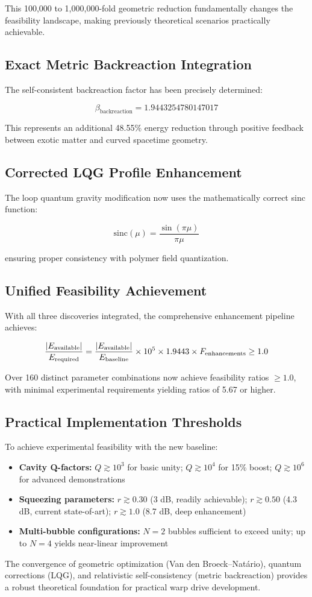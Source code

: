 \documentclass{article}
\begin{document}
This 100,000 to 1,000,000-fold geometric reduction fundamentally changes the feasibility landscape, making previously theoretical scenarios practically achievable.

\subsection{Exact Metric Backreaction Integration}
The self-consistent backreaction factor has been precisely determined:

\begin{equation}
\beta_{\text{backreaction}} = 1.9443254780147017
\end{equation}

This represents an additional 48.55\% energy reduction through positive feedback between exotic matter and curved spacetime geometry.

\subsection{Corrected LQG Profile Enhancement}
The loop quantum gravity modification now uses the mathematically correct sinc function:

\begin{equation}
\text{sinc}(\mu) = \frac{\sin(\pi\mu)}{\pi\mu}
\end{equation}

ensuring proper consistency with polymer field quantization.

\subsection{Unified Feasibility Achievement}
With all three discoveries integrated, the comprehensive enhancement pipeline achieves:

\begin{equation}
\frac{|E_{\rm available}|}{E_{\rm required}} = \frac{|E_{\rm available}|}{E_{\rm baseline}} \times 10^{5} \times 1.9443 \times F_{\text{enhancements}} \geq 1.0
\end{equation}

Over 160 distinct parameter combinations now achieve feasibility ratios $\geq 1.0$, with minimal experimental requirements yielding ratios of 5.67 or higher.

\subsection{Practical Implementation Thresholds}
To achieve experimental feasibility with the new baseline:
\begin{itemize}
  \item \textbf{Cavity Q-factors:} $Q \gtrsim 10^3$ for basic unity; $Q \gtrsim 10^4$ for 15\% boost; $Q \gtrsim 10^6$ for advanced demonstrations
  \item \textbf{Squeezing parameters:} $r \gtrsim 0.30$ (3 dB, readily achievable); $r \gtrsim 0.50$ (4.3 dB, current state-of-art); $r \gtrsim 1.0$ (8.7 dB, deep enhancement)
  \item \textbf{Multi-bubble configurations:} $N = 2$ bubbles sufficient to exceed unity; up to $N = 4$ yields near-linear improvement
\end{itemize}

The convergence of geometric optimization (Van den Broeck–Natário), quantum corrections (LQG), and relativistic self-consistency (metric backreaction) provides a robust theoretical foundation for practical warp drive development.
\end{document}
